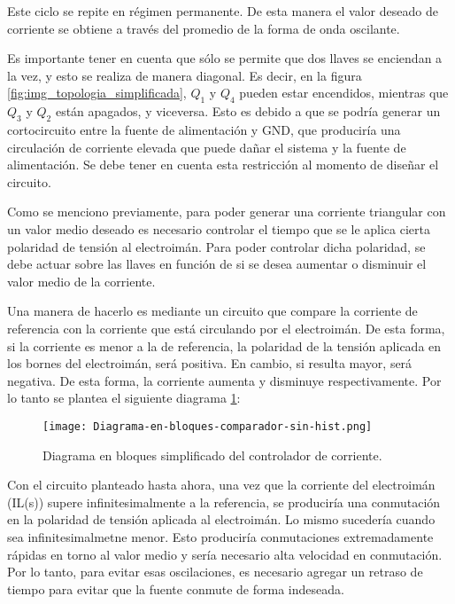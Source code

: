 Este ciclo se repite en régimen permanente. De esta manera el valor deseado de corriente se obtiene a través del promedio de la forma de onda oscilante.

Es importante tener en cuenta que sólo se permite que dos llaves se enciendan a la vez, y esto se realiza de manera diagonal. Es decir, en la figura \ref{fig:img_topologia_simplificada}, $Q_1$ y $Q_4$ pueden estar encendidos, mientras que $Q_3$ y $Q_2$ están apagados, y viceversa. Esto es debido a que se podría generar un cortocircuito entre la fuente de alimentación y GND, que produciría una circulación de corriente elevada que puede dañar el sistema y la fuente de alimentación. Se debe tener en cuenta esta restricción al momento de diseñar el circuito.

Como se menciono previamente, para poder generar una corriente triangular con un valor medio deseado es necesario controlar el tiempo que se le aplica cierta polaridad de tensión al electroimán. Para poder controlar dicha polaridad, se debe actuar sobre las llaves en función de si se desea aumentar o disminuir el valor medio de la corriente. 

Una manera de hacerlo es mediante un circuito que compare la corriente de referencia con la corriente que está circulando por el electroimán. De esta forma, si la corriente es menor a la de referencia, la polaridad de la tensión aplicada en los bornes del electroimán, será positiva. En cambio, si resulta mayor, será negativa. De esta forma, la corriente aumenta y disminuye respectivamente. Por lo tanto se plantea el siguiente diagrama \ref{fig:img_diag-en-bloques-comparador-sin-hist}:

\begin{figure}[H]
	\centering
	\texttt{[image: Diagrama-en-bloques-comparador-sin-hist.png]}
	\caption{Diagrama en bloques simplificado del controlador de corriente.}
	\label{fig:img_diag-en-bloques-comparador-sin-hist}
\end{figure}

Con el circuito planteado hasta ahora, una vez que la corriente del electroimán (IL(s)) supere infinitesimalmente a la referencia, se produciría una conmutación en la polaridad de tensión aplicada al electroimán. Lo mismo sucedería cuando sea infinitesimalmetne menor. Esto produciría conmutaciones extremadamente rápidas en torno al valor medio y sería necesario alta velocidad en conmutación. Por lo tanto, para evitar esas oscilaciones, es necesario agregar un retraso de tiempo para evitar que la fuente conmute de forma indeseada.

